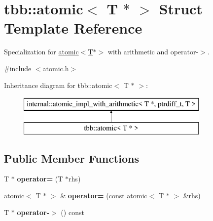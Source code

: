 \hypertarget{structtbb_1_1atomic_3_01T_01_5_01_4}{}\section{tbb\+:\+:atomic$<$ T $\ast$ $>$ Struct Template Reference}
\label{structtbb_1_1atomic_3_01T_01_5_01_4}


Specialization for \hyperlink{structtbb_1_1atomic_3_01T_01_5_01_4}{atomic$<$\+T$\ast$$>$} with arithmetic and operator-\/$>$.  




{\ttfamily \#include $<$atomic.\+h$>$}

Inheritance diagram for tbb\+:\+:atomic$<$ T $\ast$ $>$\+:\begin{figure}[H]
\begin{center}
\leavevmode
\includegraphics[height=2.000000cm]{structtbb_1_1atomic_3_01T_01_5_01_4}
\end{center}
\end{figure}
\subsection*{Public Member Functions}
\begin{DoxyCompactItemize}
\item 
\hypertarget{structtbb_1_1atomic_3_01T_01_5_01_4_a416bfaf8e47a713b11b1d8e3096b3c68}{}T $\ast$ {\bfseries operator=} (T $\ast$rhs)\label{structtbb_1_1atomic_3_01T_01_5_01_4_a416bfaf8e47a713b11b1d8e3096b3c68}

\item 
\hypertarget{structtbb_1_1atomic_3_01T_01_5_01_4_a29ded8fce076a77a1fbc3fb03195d9eb}{}\hyperlink{structtbb_1_1atomic}{atomic}$<$ T $\ast$ $>$ \& {\bfseries operator=} (const \hyperlink{structtbb_1_1atomic}{atomic}$<$ T $\ast$ $>$ \&rhs)\label{structtbb_1_1atomic_3_01T_01_5_01_4_a29ded8fce076a77a1fbc3fb03195d9eb}

\item 
\hypertarget{structtbb_1_1atomic_3_01T_01_5_01_4_a26a2a07b7d696fdafc0ce3e07303f7b3}{}T $\ast$ {\bfseries operator-\/$>$} () const \label{structtbb_1_1atomic_3_01T_01_5_01_4_a26a2a07b7d696fdafc0ce3e07303f7b3}

\end{DoxyCompactItemize}


